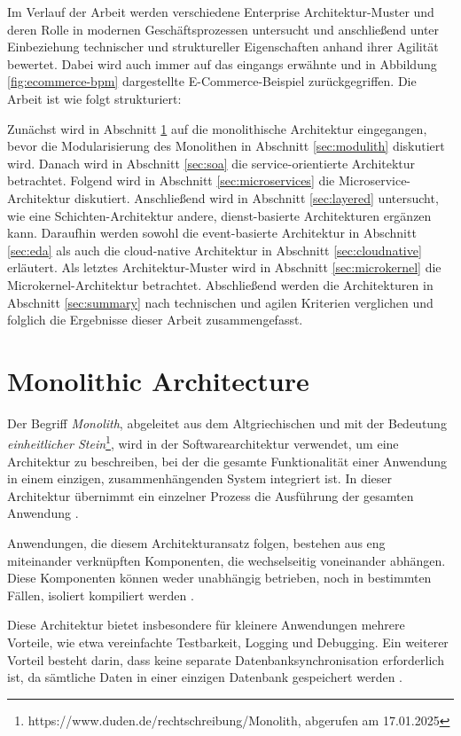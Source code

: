 \documentclass[acmtog]{acmart}
\begin{document}
Im Verlauf der Arbeit werden verschiedene Enterprise Architektur-Muster und deren Rolle in modernen Geschäftsprozessen untersucht
und anschließend unter Einbeziehung technischer und struktureller Eigenschaften anhand ihrer Agilität bewertet.
Dabei wird auch immer auf das eingangs erwähnte und in Abbildung \ref{fig:ecommerce-bpm} dargestellte E-Commerce-Beispiel zurückgegriffen.
Die Arbeit ist wie folgt strukturiert:

Zunächst wird in Abschnitt \ref{sec:monolith} auf die monolithische Architektur eingegangen, bevor die Modularisierung des Monolithen in Abschnitt \ref{sec:modulith} diskutiert wird.
Danach wird in Abschnitt \ref{sec:soa} die service-orientierte Architektur betrachtet.
Folgend wird in Abschnitt \ref{sec:microservices} die Microservice-Architektur diskutiert.
Anschließend wird in Abschnitt \ref{sec:layered} untersucht, wie eine Schichten-Architektur andere, dienst-basierte Architekturen ergänzen kann.
Daraufhin werden sowohl die event-basierte Architektur in Abschnitt \ref{sec:eda} als auch die cloud-native Architektur in Abschnitt \ref{sec:cloudnative} erläutert.
Als letztes Architektur-Muster wird in Abschnitt \ref{sec:microkernel} die Microkernel-Architektur betrachtet.
Abschließend werden die Architekturen in Abschnitt \ref{sec:summary} nach technischen und agilen Kriterien verglichen und folglich die Ergebnisse dieser Arbeit zusammengefasst.

\section{Monolithic Architecture}
\label{sec:monolith}
Der Begriff \textit{Monolith}, abgeleitet aus dem Altgriechischen und mit der Bedeutung
\textit{einheitlicher Stein}\footnote{https://www.duden.de/rechtschreibung/Monolith, abgerufen am 17.01.2025},
wird in der Softwarearchitektur verwendet, um eine Architektur zu beschreiben, bei der die gesamte Funktionalität
einer Anwendung in einem einzigen, zusammenhängenden System integriert ist.
In dieser Architektur übernimmt ein einzelner Prozess die Ausführung der gesamten Anwendung \cite[1]{mono}.

Anwendungen, die diesem Architekturansatz folgen, bestehen aus eng miteinander verknüpften
Komponenten, die wechselseitig voneinander abhängen.
Diese Komponenten können weder unabhängig betrieben, noch in bestimmten Fällen,
isoliert kompiliert werden \cite[485]{mono3}.

Diese Architektur bietet insbesondere für kleinere Anwendungen mehrere Vorteile,
wie etwa vereinfachte Testbarkeit, Logging und Debugging. Ein
weiterer Vorteil besteht darin, dass keine separate Datenbanksynchronisation
erforderlich ist, da sämtliche Daten in einer einzigen Datenbank gespeichert
werden \cite[20358]{mono4}.
\end{document}
